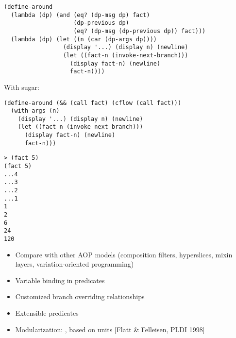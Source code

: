 \documentclass[landscape]{slides}
\begin{document}
\begin{slide}
  \begin{verbatim}
(define-around
  (lambda (dp) (and (eq? (dp-msg dp) fact)
                    (dp-previous dp)
                    (eq? (dp-msg (dp-previous dp)) fact)))
  (lambda (dp) (let ((n (car (dp-args dp))))
                 (display '...) (display n) (newline)
                 (let ((fact-n (invoke-next-branch)))
                   (display fact-n) (newline)
                   fact-n))))
\end{verbatim}
\end{slide}

\begin{slide}
With sugar:
\begin{verbatim}
(define-around (&& (call fact) (cflow (call fact)))
  (with-args (n)
    (display '...) (display n) (newline)
    (let ((fact-n (invoke-next-branch)))
      (display fact-n) (newline)
      fact-n)))
\end{verbatim}
\end{slide}

\begin{slide}
  \begin{verbatim}
> (fact 5)
(fact 5)
...4
...3
...2
...1
1
2
6
24
120
  \end{verbatim}
\end{slide}

\begin{slide}

  \begin{itemize}
    \item Compare with other AOP models (composition filters, hyperslices,
          mixin layers, variation-oriented programming)
    \item Variable binding in predicates
    \item Customized branch overriding relationships
    \item Extensible predicates
    \item Modularization: , based on units [Flatt \&
          Felleisen, PLDI 1998]
  \end{itemize}
\end{slide}
\end{document}
